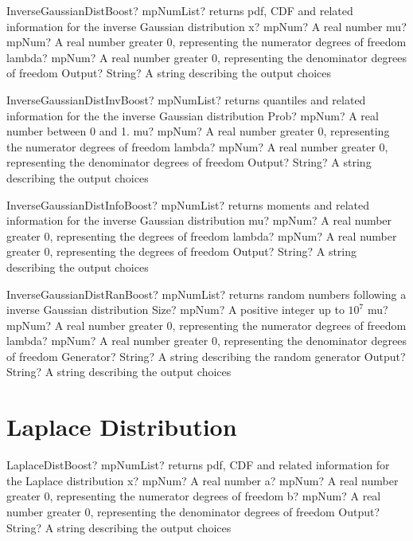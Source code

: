 \documentclass[12pt,a4paper,openany]{book}
\begin{document}
\begin{mpFunctionsExtract}
\mpFunctionFour
{InverseGaussianDistBoost? mpNumList? returns pdf, CDF and related information for the inverse Gaussian distribution}
{x? mpNum? A real number}
{mu? mpNum? A real number greater 0, representing the numerator  degrees of freedom}
{lambda? mpNum? A real number greater 0, representing the denominator degrees of freedom}
{Output? String? A string describing the output choices}
\end{mpFunctionsExtract}

\begin{mpFunctionsExtract}
\mpFunctionFour
{InverseGaussianDistInvBoost? mpNumList? returns quantiles and related information for the the inverse Gaussian distribution}
{Prob? mpNum? A real number between 0 and 1.}
{mu? mpNum? A real number greater 0, representing the numerator  degrees of freedom}
{lambda? mpNum? A real number greater 0, representing the denominator degrees of freedom}
{Output? String? A string describing the output choices}
\end{mpFunctionsExtract}

\begin{mpFunctionsExtract}
\mpFunctionThree
{InverseGaussianDistInfoBoost? mpNumList? returns moments and related information for the inverse Gaussian distribution}
{mu? mpNum? A real number greater 0, representing the degrees of freedom}
{lambda? mpNum? A real number greater 0, representing the degrees of freedom}
{Output? String? A string describing the output choices}
\end{mpFunctionsExtract}

\begin{mpFunctionsExtract}
\mpFunctionFive
{InverseGaussianDistRanBoost? mpNumList? returns random numbers following a inverse Gaussian distribution}
{Size? mpNum? A positive integer up to $10^7$}
{mu? mpNum? A real number greater 0, representing the numerator  degrees of freedom}
{lambda? mpNum? A real number greater 0, representing the denominator degrees of freedom}
{Generator? String? A string describing the random generator}
{Output? String? A string describing the output choices}
\end{mpFunctionsExtract}

\section{Laplace Distribution}

\begin{mpFunctionsExtract}
\mpFunctionFour
{LaplaceDistBoost? mpNumList? returns pdf, CDF and related information for the Laplace distribution}
{x? mpNum? A real number}
{a? mpNum? A real number greater 0, representing the numerator  degrees of freedom}
{b? mpNum? A real number greater 0, representing the denominator degrees of freedom}
{Output? String? A string describing the output choices}
\end{mpFunctionsExtract}
\end{document}

